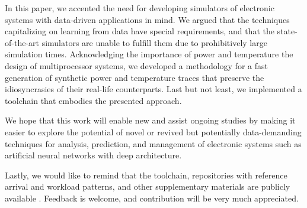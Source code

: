 In this paper, we accented the need for developing simulators of electronic
systems with data-driven applications in mind. We argued that the techniques
capitalizing on learning from data have special requirements, and that the
state-of-the-art simulators are unable to fulfill them due to prohibitively
large simulation times. Acknowledging the importance of power and temperature
the design of multiprocessor systems, we developed a methodology for a fast
generation of synthetic power and temperature traces that preserve the
idiosyncrasies of their real-life counterparts. Last but not least, we
implemented a toolchain that embodies the presented approach.

We hope that this work will enable new and assist ongoing studies by making it
easier to explore the potential of novel or revived but potentially
data-demanding techniques for analysis, prediction, and management of electronic
systems such as artificial neural networks with deep architecture.

Lastly, we would like to remind that the toolchain, repositories with reference
arrival and workload patterns, and other supplementary materials are publicly
available \cite{sources}. Feedback is welcome, and contribution will be very
much appreciated.
